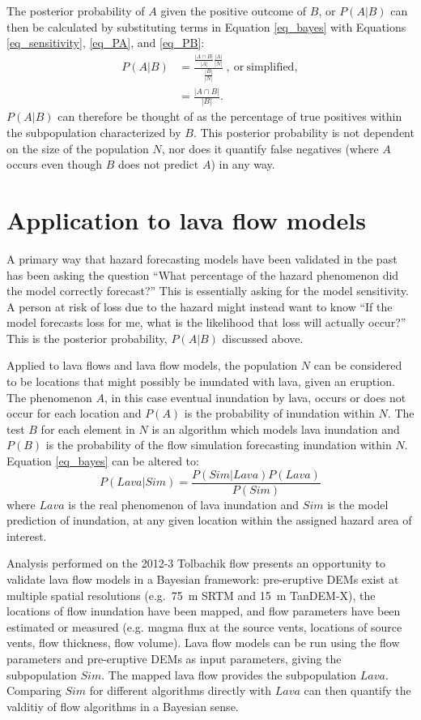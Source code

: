 \documentclass[12pt,letter]{article}
\begin{document}
The posterior probability of $A$ given the positive outcome of $B$, or $P(A|B)$ can then be calculated by substituting terms in Equation \ref{eq_bayes} with Equations \ref{eq_sensitivity}, \ref{eq_PA}, and \ref{eq_PB}:
\begin{align}
P(A|B)&=\frac{\frac{|A\cap B|}{|A|}\frac{|A|}{|N|}}{\frac{|B|}{|N|}}~\mathrm{,~or~simplified,}\label{eq_unsimplepost}\\
&=\frac{|A\cap B|}{|B|}.\label{eq_simplepost}
\end{align}
$P(A|B)$ can therefore be thought of as the percentage of true positives within the subpopulation characterized by $B$. This posterior probability is not dependent on the size of the population $N$, nor does it quantify false negatives (where $A$ occurs even though $B$ does not predict $A$) in any way.

\section{Application to lava flow models}\label{sec:lava_app}
A primary way that hazard forecasting models have been validated in the past has been asking the question ``What percentage of the hazard phenomenon did the model correctly forecast?'' This is essentially asking for the model sensitivity. A person at risk of loss due to the hazard might instead want to know ``If the model forecasts loss for me, what is the likelihood that loss will actually occur?'' This is the posterior probability, $P(A|B)$ discussed above.

Applied to lava flows and lava flow models, the population $N$ can be considered to be locations that might possibly be inundated with lava, given an eruption. The phenomenon $A$, in this case eventual inundation by lava, occurs or does not occur for each location and $P(A)$ is the probability of inundation within $N$. The test $B$ for each element in $N$ is an algorithm which models lava inundation and $P(B)$ is the probability of the flow simulation forecasting inundation within $N$. Equation \ref{eq_bayes} can be altered to:
\begin{equation}
P(Lava|Sim)=\frac{P(Sim|Lava)P(Lava)}{P(Sim)}\label{eq_lavabayes}
\end{equation}
where $Lava$ is the real phenomenon of lava inundation and $Sim$ is the model prediction of inundation, at any given location within the assigned hazard area of interest.

Analysis performed on the 2012-3 Tolbachik flow presents an opportunity to validate lava flow models in a Bayesian framework: pre-eruptive DEMs exist at multiple spatial resolutions (e.g.~75~m SRTM and 15~m TanDEM-X), the locations of flow inundation have been mapped, and flow parameters have been estimated or measured (e.g. magma flux at the source vents, locations of source vents, flow thickness, flow volume). Lava flow models can be run using the flow parameters and pre-eruptive DEMs as input parameters, giving the subpopulation $Sim$. The mapped lava flow provides the subpopulation $Lava$. Comparing $Sim$ for different algorithms directly with $Lava$ can then quantify the valditiy of flow algorithms in a Bayesian sense.
\end{document}

